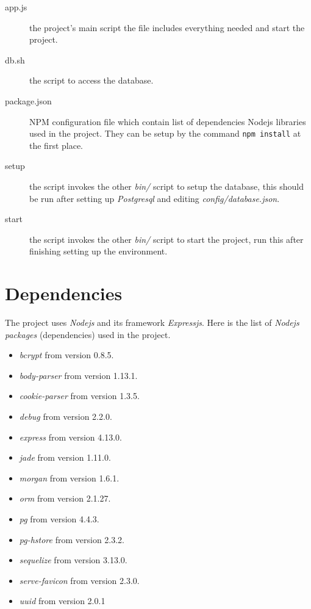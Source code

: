 \begin{description}
\item[app.js] the project's main script \ie the file includes everything needed and start the project.
\item[db.sh] the script to access the database.
\item[package.json] NPM configuration file which contain list of dependencies Nodejs libraries used in the project.
They can be setup by the command \lstinline|npm install| at the first place.
\item[setup] the script invokes the other \emph{bin/} script to setup the database, this should be run after setting up \emph{Postgresql} and editing \emph{config/database.json}.
\item[start] the script invokes the other \emph{bin/} script to start the project, run this after finishing setting up the environment.

\end{description}


\section{Dependencies}
\label{ch:appendix:dependencies}

The project uses \emph{Nodejs} and its framework \emph{Expressjs}. 
Here is the list of \emph{Nodejs packages} (dependencies) used in the project.

\begin{itemize}
\item \emph{bcrypt} from version 0.8.5.
\item \emph{body-parser} from version 1.13.1.
\item \emph{cookie-parser} from version 1.3.5.
\item \emph{debug} from version 2.2.0.
\item \emph{express} from version 4.13.0.
\item \emph{jade} from version 1.11.0.
\item \emph{morgan} from version 1.6.1.
\item \emph{orm} from version 2.1.27.
\item \emph{pg} from version 4.4.3.
\item \emph{pg-hstore} from version 2.3.2.
\item \emph{sequelize} from version 3.13.0.
\item \emph{serve-favicon} from version 2.3.0.
\item \emph{uuid} from version 2.0.1
\end{itemize}
